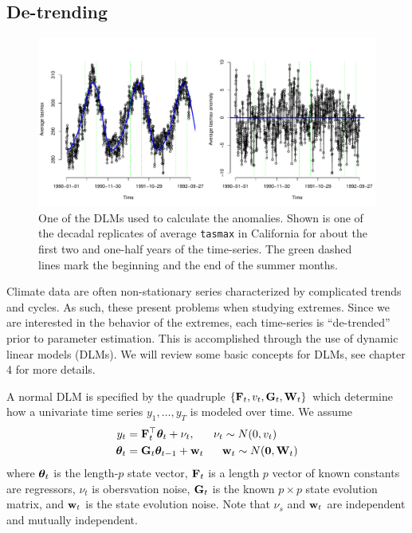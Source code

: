 \subsection{De-trending}
\label{anomaly}

\begin{figure}
\begin{center}
\includegraphics[scale=0.50]{figs/dlm.pdf}
\end{center}
\caption{One of the DLMs used to calculate the anomalies. Shown is one of the decadal replicates of average \texttt{tasmax} in California for about the first two and one-half years of the time-series. The green dashed lines mark the beginning and the end of the summer months.}
\label{dlm_fig}
\end{figure}

Climate data are often non-stationary series characterized by complicated trends and cycles. As such, these present problems when studying extremes. Since we are interested in the behavior of the extremes, each time-series is ``de-trended'' prior to parameter estimation. This is accomplished through the use of dynamic linear models (DLMs). We will review some basic concepts for DLMs, see \cite{prado2010time} chapter 4 for more details.

A normal DLM is specified by the quadruple $\{\mathbf{\bm{F}}_t, v_t, \mathbf{\bm{G}}_t, \mathbf{\bm{W}}_t\}$ which determine how a univariate time series $y_1,\ldots,y_T$ is modeled over time. We assume
\begin{align}
y_t &= \mathbf{\bm{F}}_t^\top\mathbf{\bm{\theta}}_t + \nu_t,~~~~~\nu_t\sim N(0, v_t) \label{dlm_model} \\
\mathbf{\bm{\theta}}_t &= \mathbf{\bm{G}}_t\mathbf{\bm{\theta}}_{t-1}+\mathbf{\bm{w}}_t~~~~~\mathbf{\bm{w}}_t\sim N(\mathbf{\bm{0}}, \mathbf{\bm{W}}_t) \nonumber
\end{align}
where $\mathbf{\bm{\theta}}_t$ is the length-$p$ state vector, $\mathbf{\bm{F}}_t$ is a length $p$ vector of known constants are regressors, $\nu_t$ is obersvation noise, $\mathbf{\bm{G}}_t$ is the known $p\times p$ state evolution matrix, and $\mathbf{\bm{w}}_t$ is the state evolution noise. Note that $\nu_s$ and $\mathbf{\bm{w}}_t$ are independent and mutually independent.

